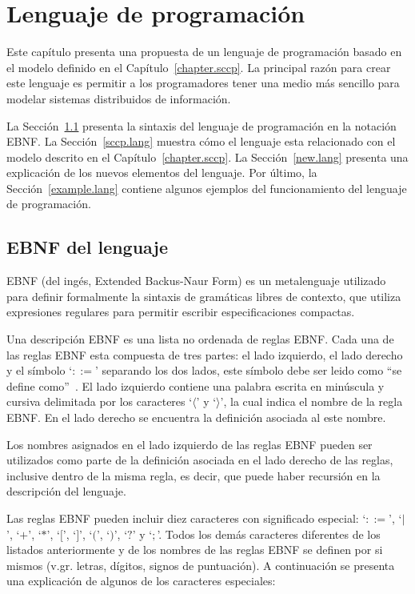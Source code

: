 
\chapter{Lenguaje de programaci\'on}
\label{chapter.lang}

Este cap\'itulo presenta una propuesta de un lenguaje de programaci\'on basado en el modelo \SCCP definido en el Cap\'itulo~\ref{chapter.sccp}. La principal raz\'on para crear este lenguaje es permitir a los programadores tener una medio m\'as sencillo para modelar sistemas distribuidos de informaci\'on.  

La Secci\'on~\ref{ebnf.lang} presenta la sintaxis del lenguaje de programaci\'on en la notaci\'on EBNF. La Secci\'on~\ref{sccp.lang} muestra c\'omo el lenguaje esta relacionado con el modelo \SCCP descrito en el Cap\'itulo~\ref{chapter.sccp}. La Secci\'on~\ref{new.lang} presenta una explicaci\'on de los nuevos elementos del lenguaje. Por \'ultimo, la Secci\'on~\ref{example.lang} contiene algunos ejemplos del funcionamiento del lenguaje de programaci\'on.

\section{EBNF del lenguaje}
\label{ebnf.lang}

EBNF (del ing\'es, Extended Backus-Naur Form) es un metalenguaje utilizado para definir formalmente la sintaxis de gram\'aticas libres de contexto, que utiliza expresiones regulares para permitir escribir especificaciones compactas. 

Una descripci\'on EBNF es una lista no ordenada de reglas EBNF. Cada una de las reglas EBNF esta compuesta de tres partes: el lado izquierdo, el lado derecho y el s\'imbolo `$::=$' separando los dos lados, este s\'imbolo debe ser leido como ``se define como''~\cite{ebnfdoc}. El lado izquierdo contiene una palabra escrita en min\'uscula y cursiva delimitada por los caracteres `$\langle$' y `$\rangle$', la cual indica el nombre de la regla EBNF. En el lado derecho se encuentra la definici\'on asociada al este nombre. 

Los nombres asignados en el lado izquierdo de las reglas EBNF pueden ser utilizados como parte de la definici\'on asociada en el lado derecho de las reglas, inclusive dentro de la misma regla, es decir, que puede haber recursi\'on en la descripci\'on del lenguaje.

Las reglas EBNF pueden incluir diez caracteres con significado especial: `$::=$', `$|$', `$+$', `$*$', `$[$', `$]$', `$($', `$)$', `$?$' y `$;$'. Todos los dem\'as caracteres diferentes de los listados anteriormente y de los nombres de las reglas EBNF se definen por si mismos (v.gr. letras, d\'igitos, signos de puntuaci\'on). A continuaci\'on se presenta una explicaci\'on de algunos de los caracteres especiales:

